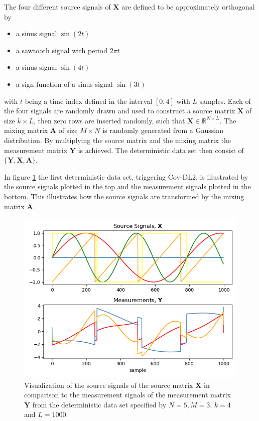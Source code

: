 The four different source signals of $\mathbf{X}$ are defined to be approximately orthogonal by
\begin{itemize}
\item[1.] a sinus signal $\sin(2t)$
\item[2.] a sawtooth signal with period $2 \pi t$
\item[3.] a sinus signal $\sin(4t)$
\item[4.] a sign function of a sinus signal $\sin(3t)$
\end{itemize}
 with $t$ being a time index defined in the interval $[0,4]$ with $L$ samples. 
Each of the four signals are randomly drawn and used to construct a source matrix $\mathbf{X}$ of size $k \times L$, then zero rows are inserted randomly, such that $\mathbf{X} \in \mathbb{R}^{N \times L}$. 
The mixing matrix $\mathbf{A}$ of size $M \times N$ is randomly generated from a Gaussian distribution. 
By multiplying the source matrix and the mixing matrix the measurement matrix $\mathbf{Y}$ is achieved.
The deterministic data set then consist of $\{ \mathbf{Y}, \mathbf{X}, \mathbf{A} \}$.

In figure \ref{fig:simple} the first deterministic data set, triggering Cov-DL2, is illustrated by the source signals plotted in the top and the measurement signals plotted in the bottom. 
This illustrates how the source signals are transformed by the mixing matrix $\mathbf{A}$.
\begin{figure}[H]
\centering
\includegraphics[scale=0.5]{figures/ch_6/simple_data.png}
\caption{Visualization of the source signals of the source matrix $\mathbf{X}$ in comparison to the measurement signals of the measurement matrix $\mathbf{Y}$ from the deterministic data set specified by $N = 5, M = 3$, $k = 4$ and $L=1000$.}
\label{fig:simple}
\end{figure}
\noindent

